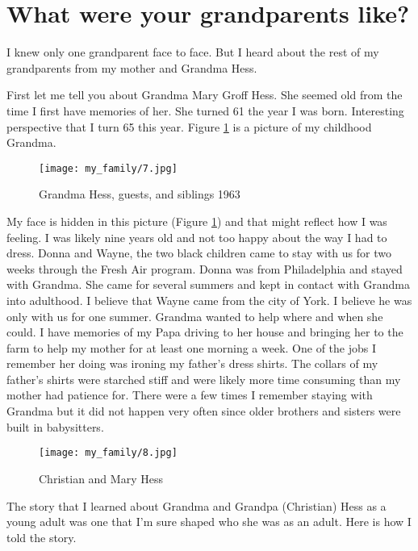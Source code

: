 \section{What were your grandparents like?}
I knew only one grandparent face to face.
But I heard about the rest of my grandparents from my mother and Grandma Hess.

First let me tell you about Grandma Mary Groff Hess.
She seemed old from the time I first have memories of her.
She turned 61 the year I was born.
Interesting perspective that I turn 65 this year.
Figure \ref{grandma-hess} is a picture of my childhood Grandma.
\begin{figure}[h!]
\centering
\texttt{[image: my\_family/7.jpg]}
\caption{Grandma Hess, guests, and siblings 1963}
\label{grandma-hess}
\end{figure}

My face is hidden in this picture (Figure \ref{grandma-hess}) and that might reflect how I was feeling.
I was likely nine years old and not too happy about the way I had to dress.
Donna and Wayne, the two black children came to stay with us for two weeks through the Fresh Air program.
Donna was from Philadelphia and stayed with Grandma.
She came for several summers and kept in contact with Grandma into adulthood.
I believe that Wayne came from the city of York.
I believe he was only with us for one summer.
Grandma wanted to help where and when she could.
I have memories of my Papa driving to her house and bringing her to the farm to help my mother for at least one morning a week.
One of the jobs I remember her doing was ironing my father's dress shirts.
The collars of my father's shirts were starched stiff and were likely more time consuming than my mother had patience for.
There were a few times I remember staying with Grandma but it did not happen very often since older brothers and sisters were built in babysitters.

\begin{figure}
\centering
\texttt{[image: my\_family/8.jpg]}
\caption{Christian and Mary Hess}
\label{christian-mary-hess}
\end{figure}

The story that I learned about Grandma and Grandpa (Christian) Hess as a young adult was one that I'm sure shaped who she was as an adult. Here is how I told the story.

